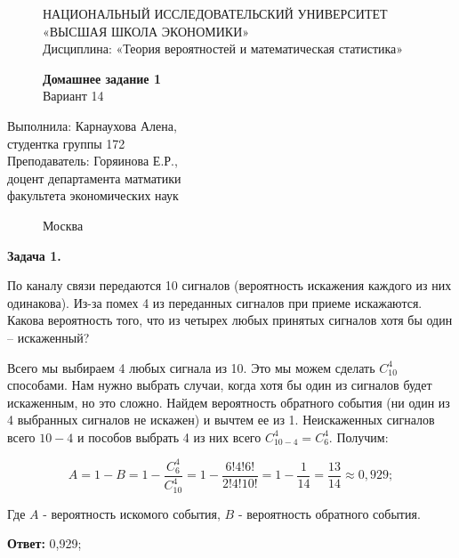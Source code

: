 \documentclass[]{article}
\begin{document}
	\begin{figure}[t]
		\centering
		\large
		НАЦИОНАЛЬНЫЙ ИССЛЕДОВАТЕЛЬСКИЙ УНИВЕРСИТЕТ\\
		«ВЫСШАЯ ШКОЛА ЭКОНОМИКИ»\\
		Дисциплина: «Теория вероятностей и математическая статистика»
	\end{figure}
	
	\begin{figure}[h]
	\vspace{3in}
	\centering
	\Huge
	\textbf{Домашнее задание 1}\\
	Вариант 14 
	\end{figure}
	
	\vspace{2in}
	\Large
	\raggedleft
	Выполнила: Карнаухова Алена,\\
	студентка группы 172\\
	\vspace{12pt}
	Преподаватель: Горяинова Е.Р.,\\
	доцент департамента матматики\\
	факультета экономических наук
	
	\begin{figure}[b]
		\centering
		Москва \the\year
	\end{figure}
	
	\thispagestyle{empty}
	
	\newpage
	
	\centering
	\textbf{Задача 1.}
	
	\vspace{10pt}
	
	\raggedright
	\large

	По каналу связи передаются 10 сигналов (вероятность искажения каждого
из них одинакова). Из-за помех 4 из переданных сигналов при приеме искажаются. Какова
вероятность того, что из четырех любых принятых сигналов хотя бы один – искаженный?

	\vspace{20pt}
	
	Всего мы выбираем 4 любых сигнала из 10. Это мы можем сделать $C_{10}^4$ способами. Нам нужно выбрать случаи, когда хотя бы один из сигналов будет искаженным, но это сложно. Найдем вероятность обратного события (ни один из 4 выбранных сигналов не искажен) и вычтем ее из 1. Неискаженных сигналов всего $10-4$ и пособов выбрать 4 из них всего $C_{10-4}^4 = C_{6}^4$. Получим:
	
	\begin{equation}
	A = 1 - B = 1 - \frac{C_6^4}{C_{10}^4} = 1 - \frac{6!4!6!}{2!4!10!} = 1 - \frac{1}{14} = \frac{13}{14} \approx 0,929;
	\end{equation}
	
	Где $A$ - вероятность искомого события, $B$ - вероятность обратного события.
	
	\vspace{10pt}
	
	\textbf{Ответ:} 0,929;
	
\end{document}
